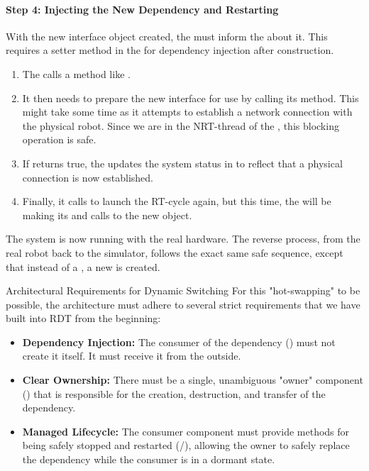 \paragraph{Step 4: Injecting the New Dependency and Restarting}
With the new interface object created, the  must inform the  about it. This requires a setter method in the  for dependency injection after construction.
\begin{enumerate}
    \item The  calls a method like .
    \item It then needs to prepare the new interface for use by calling its  method. This might take some time as it attempts to establish a network connection with the physical robot. Since we are in the NRT-thread of the , this blocking operation is safe.
    \item If  returns true, the  updates the system status in  to reflect that a physical connection is now established.
    \item Finally, it calls  to launch the RT-cycle again, but this time, the  will be making its  and  calls to the new  object.
\end{enumerate}

The system is now running with the real hardware. The reverse process, from the real robot back to the simulator, follows the exact same safe sequence, except that instead of a , a new  is created.

\begin{principlebox}{Architectural Requirements for Dynamic Switching}
For this "hot-swapping" to be possible, the architecture must adhere to several strict requirements that we have built into RDT from the beginning:
\begin{itemize}
    \item \textbf{Dependency Injection:} The consumer of the dependency () must not create it itself. It must receive it from the outside.
    \item \textbf{Clear Ownership:} There must be a single, unambiguous "owner" component () that is responsible for the creation, destruction, and transfer of the dependency.
    \item \textbf{Managed Lifecycle:} The consumer component must provide methods for being safely stopped and restarted (/), allowing the owner to safely replace the dependency while the consumer is in a dormant state.
\end{itemize}
\end{principlebox}

